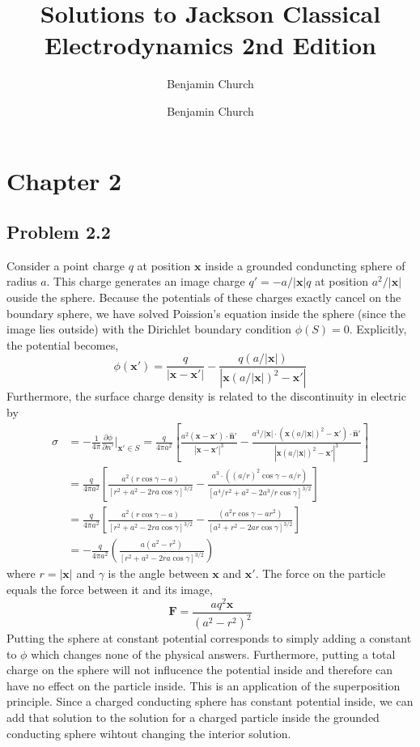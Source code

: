 \documentclass[12pt]{extarticle}
\author{Benjamin Church }
\newcommand{\pderiv}[2]{\frac{\partial{#1}}{\partial{#2}}}
\renewcommand{\bf}[1]{\mathbf{#1}}
\theoremstyle{definition}
\newcommand{\nhat}{\hat{\bf{n}}}
\newcommand{\x}{\mathbf{x}}
\begin{document}
\title{Solutions to Jackson Classical Electrodynamics 2nd Edition}
\author{Benjamin Church}
\maketitle
\tableofcontents

\section{Chapter 2}

\subsection{Problem 2.2}

Consider a point charge $q$ at position $\x$ inside a grounded conduncting sphere of radius $a$. This charge generates an image charge $q' = - a / |\x| q$ at position $a^2 / |\x|$ ouside the sphere. Because the potentials of these charges exactly cancel on the boundary sphere, we have solved Poission's equation inside the sphere (since the image lies outside) with the Dirichlet boundary condition $\phi(S) = 0$. Explicitly, the potential becomes,
\[ \phi(\x') = \frac{q}{|\x - \x'|} - \frac{q \left(a / |\x|\right)}{| \x \left( a / |\x| \right)^2 - \x'|} \]  
Furthermore, the surface charge density is related to the discontinuity in electric by
\begin{align*}
\sigma & = -\frac{1}{4 \pi} \pderiv{\phi}{n'} \bigg|_{\x' \in S} =  \frac{q}{4 \pi a^2} \left[ \frac{a^2 (\x - \x') \cdot \nhat'}{|\x - \x'|^3} - \frac{a^3 / |\x| \cdot (\x (a / |\x|)^2 - \x') \cdot \nhat'}{| \x (a / |\x|)^2 - \x'|^3} \right] 
\\
& =   \frac{q}{4 \pi a^2} \left[ \frac{a^2 (r \cos{\gamma} - a)}{[r^2 + a^2 - 2 ra \cos{\gamma}]^{3/2}} - \frac{a^3 \cdot ( (a / r)^2 \cos{\gamma} - a/r)}{[a^4 / r^2 + a^2 - 2 a^3 / r \cos{\gamma} ]^{3/2}} \right] 
\\
& =  \frac{q}{4 \pi a^2} \left[ \frac{a^2 (r \cos{\gamma} - a)}{[r^2 + a^2 - 2 ra \cos{\gamma}]^{3/2}} - \frac{( a^2 r \cos{\gamma} - ar^2)}{[a^2 + r^2 - 2 a r \cos{\gamma} ]^{3/2}} \right] 
\\
& = - \frac{q}{4 \pi a^2} \left( \frac{a (a^2 - r^2) }{[r^2 + a^2 - 2 ra \cos{\gamma}]^{3/2}}\right) 
\end{align*} 
where $r = |\x|$ and $\gamma$ is the angle between $\x$ and $\x'$. The force on the particle equals the force between it and its image,
\[ \mathbf{F} = \frac{a q^2 \x}{(a^2 - r^2)^2} \]
Putting the sphere at constant potential corresponds to simply adding a constant to $\phi$ which changes none of the physical answers. Furthermore, putting a total charge on the sphere will not influcence the potential inside and therefore can have no effect on the particle inside. This is an application of the superposition principle. Since a charged conducting sphere has constant potential inside, we can add that solution to the solution for a charged particle inside the grounded conducting sphere wihtout changing the interior solution. 
\end{document}
